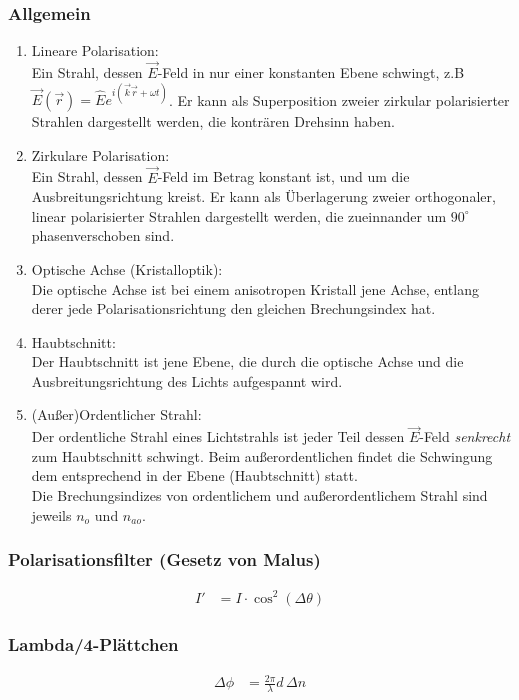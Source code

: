 \documentclass[twocolumn, unnumberedsubsub]{summery_3.1}
\begin{document}
\subsubsection{Allgemein}
\begin{enumerate}
    \item Lineare Polarisation:\\
    Ein Strahl, dessen \(\vec E\)-Feld in nur einer konstanten Ebene schwingt, z.B 
    $\vec E(\vec r) = \hat E e^{i(\vec k \vec r + \omega t)}$. Er kann als Superposition zweier zirkular polarisierter Strahlen dargestellt werden, 
    die konträren Drehsinn haben.
    \item Zirkulare Polarisation:\\
    Ein Strahl, dessen \(\vec E\)-Feld im Betrag konstant ist, und um die Ausbreitungsrichtung
    kreist. Er kann als Überlagerung zweier orthogonaler, linear polarisierter
    Strahlen dargestellt werden, die zueinnander um \(90^\circ\) phasenverschoben sind.
    \item Optische Achse (Kristalloptik):\\
    Die optische Achse ist bei einem anisotropen Kristall jene Achse, entlang derer 
    jede Polarisationsrichtung den gleichen Brechungsindex hat.
    \item Haubtschnitt:\\
    Der Haubtschnitt ist jene Ebene, die durch die optische Achse und die Ausbreitungsrichtung 
    des Lichts aufgespannt wird.
    \item (Au{\ss}er)Ordentlicher Strahl:\\
    Der ordentliche Strahl eines Lichtstrahls ist jeder Teil dessen \(\vec E\)-Feld \emph{senkrecht}
    zum Haubtschnitt schwingt. Beim au{\ss}erordentlichen findet die Schwingung dem entsprechend 
    in der Ebene (Haubtschnitt) statt.\\
    Die Brechungsindizes von ordentlichem und au{\ss}erordentlichem Strahl sind 
    jeweils \(n_o\) und \(n_{ao}\).
\end{enumerate}

\subsubsection{Polarisationsfilter (Gesetz von Malus)}
\begin{align*}
    I' &= I \cdot \cos^2(\Delta \theta)
\end{align*}

\subsubsection{Lambda/4-Plättchen}
\begin{align*}
\Delta \phi &=\frac{2\pi}{\lambda} d \,\Delta n
\end{align*}
\end{document}
